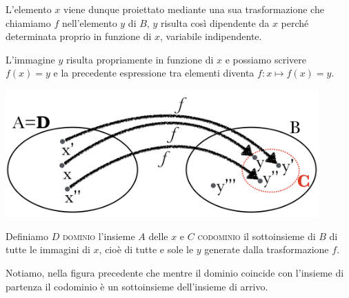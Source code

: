 L'elemento \(x\) viene dunque proiettato mediante una sua trasformazione che 
chiamiamo \(f\) nell'elemento \(y\) di \(B\), \(y\) risulta così dipendente 
da \(x\) perché determinata proprio in funzione di \(x\), variabile 
indipendente.

L'immagine \(y\) risulta propriamente in funzione di \(x\) e possiamo scrivere 
\(f(x)=y\) e la precedente espressione tra elementi diventa \(f: x\mapsto 
f(x)=y\).

\begin{minipage}{.59\textwidth}
\begin{center}
\includegraphics[width=0.9\textwidth]{img/2_funz.png}
\end{center}
\end{minipage}
\begin{minipage}{.39\textwidth}
Definiamo \(D\) \textsc{dominio} l'insieme \(A\) delle \(x\) e \(C\) 
\textsc{codominio} il sottoinsieme di \(B\) di tutte le immagini di \(x\), 
cioè di tutte e sole le \(y\) generate dalla trasformazione \(f\).

Notiamo, nella figura precedente che mentre il dominio coincide con 
l'insieme di partenza il codominio è un sottoinsieme dell'insieme di arrivo.
\end{minipage}


